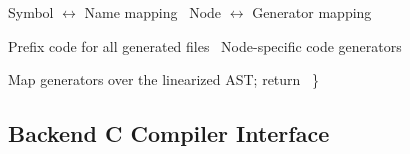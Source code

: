 \documentclass{article}%
\begin{document}
        \LA{}Symbol $\longleftrightarrow$ Name mapping~{\nwtagstyle{}}\RA{}
        \LA{}Node $\longleftrightarrow$ Generator mapping~{\nwtagstyle{}}\RA{}

        \LA{}Prefix code for all generated files~{\nwtagstyle{}}\RA{}
        \LA{}Node-specific code generators~{\nwtagstyle{}}\RA{}

        \LA{}Map generators over the linearized AST; return~{\nwtagstyle{}}\RA{}
\}
\nwendcode{}\nwdocspar

\subsection{Backend C Compiler Interface}
\end{document}
